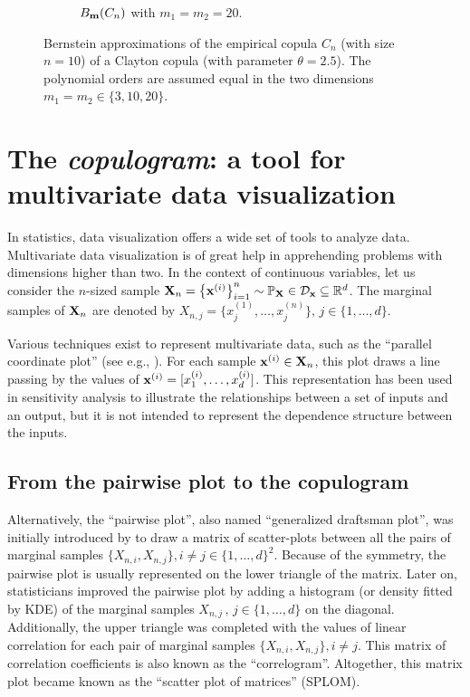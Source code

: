 \begin{figure}
\begin{subfigure}[b]{0.49\textwidth}
        \caption{$B_{{\bf m}}(C_n)$ with $m_1=m_2=20$.}
    \end{subfigure}
    \centering
    \caption{Bernstein approximations of the empirical copula $C_n$ (with size $n=10$) of a Clayton copula (with parameter $\theta=2.5$). The polynomial orders are assumed equal in the two dimensions $m_1=m_2\in\{3, 10, 20\}$.}
    \label{fig:ebc_illustration}
\end{figure}

\section{The \textit{copulogram}: a tool for multivariate data visualization}\label{sec:copulogram}
In statistics, data visualization offers a wide set of tools to analyze data. 
Multivariate data visualization is of great help in apprehending problems with dimensions higher than two. 
In the context of continuous variables, let us consider the $n$-sized sample ${\bf X}_n = \left\{{\bf x}^{(i)}\right\}_{i=1}^n \sim \mathbb{P}_{{\bf X}} \in \mathcal{D}_{{\bf x}}\subseteq\mathbb{R}^d$. 
The marginal samples of ${\bf X}_n$ are denoted by $X_{n, j} = \{x_j^{(1)}, \dots, x_j^{(n)}\}, \, j\in \{1, \dots, d\}$.

Various techniques exist to represent multivariate data, such as the ``parallel coordinate plot'' (see e.g., \citealp{heinrich_2013_cobweb}). 
For each sample ${\bf x}^{(i)} \in {\bf X}_n$, this plot draws a line passing by the values of ${\bf x}^{(i)} = [x_1^{(i)}, \dots, x_d^{(i)}]$. 
This representation has been used in sensitivity analysis to illustrate the relationships between a set of inputs and an output, but it is not intended to represent the dependence structure between the inputs. 

\subsection{From the pairwise plot to the copulogram}
Alternatively, the ``pairwise plot'', also named ``generalized draftsman plot'', was initially introduced by \citet{hartigan_1975_splom} to draw a matrix of scatter-plots between all the pairs of marginal samples $\{X_{n, i}, X_{n, j}\}, i \ne j \in \{1, \dots, d\}^2$. 
Because of the symmetry, the pairwise plot is usually represented on the lower triangle of the matrix. 
Later on, statisticians improved the pairwise plot by adding a histogram (or density fitted by KDE) of the marginal samples $X_{n, j}\, , \, j \in \{1, \dots, d\}$ on the diagonal. 
Additionally, the upper triangle was completed with the values of linear correlation for each pair of marginal samples $\{X_{n, i}, X_{n, j}\}, i \ne j$. 
This matrix of correlation coefficients is also known as the ``correlogram''. 
Altogether, this matrix plot became known as the ``scatter plot of matrices'' (SPLOM). 

